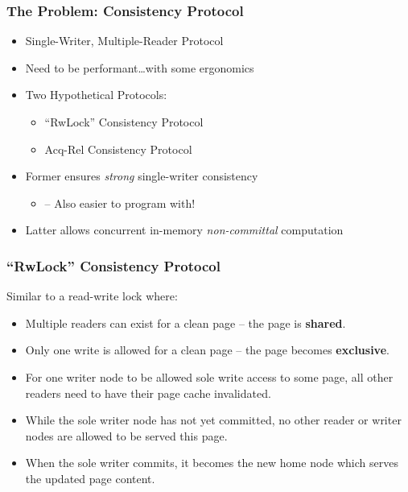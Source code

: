 \documentclass{beamer}
\begin{document}
\begin{frame}
    \frametitle{The Problem: Consistency Protocol}
    \begin{itemize}
        \item Single-Writer, Multiple-Reader Protocol
        \item Need to be performant\dots with some ergonomics
        \item {
            Two Hypothetical Protocols:
            \begin{itemize}
                \item ``RwLock'' Consistency Protocol
                \item Acq-Rel Consistency Protocol
            \end{itemize}
        }
        \item {
            Former ensures \emph{strong} single-writer consistency
            \begin{itemize}
                \item -- Also easier to program with!
            \end{itemize}
        }
        \item Latter allows concurrent in-memory \emph{non-committal} computation
    \end{itemize}
\end{frame}

\begin{frame}
    \frametitle{``RwLock'' Consistency Protocol}
    Similar to a read-write lock where:
    \begin{itemize}
        \item Multiple readers can exist for a clean page -- the page is \textbf{shared}.
        \item Only one write is allowed for a clean page -- the page becomes \textbf{exclusive}.
        \item {
            For one writer node to be allowed sole write access to some page, all other
            readers need to have their page cache invalidated.
        }
        \item {
            While the sole writer node has not yet committed, no other reader or writer nodes
            are allowed to be served this page.
        }
        \item {
            When the sole writer commits, it becomes the new home node which serves the
            updated page content.
        }
    \end{itemize}
\end{frame}
\end{document}
